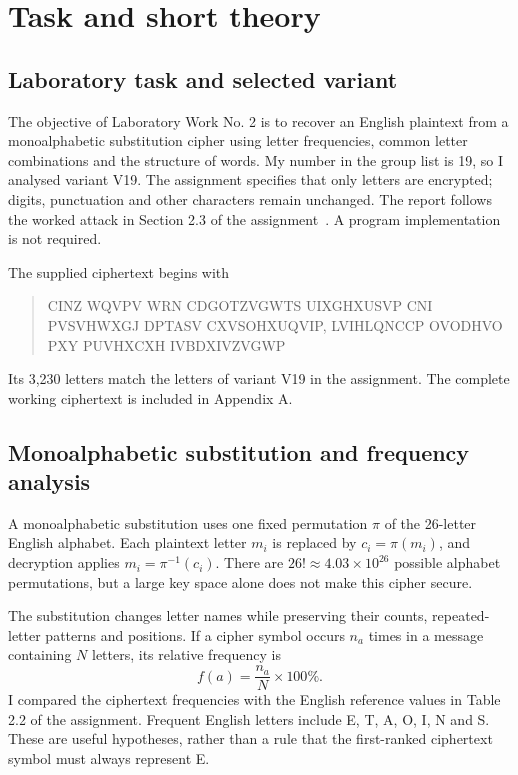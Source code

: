 \documentclass{tum_report}
\begin{document}

\clearpage
{}
\tableofcontents
\thispagestyle{empty}
\clearpage
\pagestyle{fancy}

\chapter{Task and short theory}
\section{Laboratory task and selected variant}
The objective of Laboratory Work No. 2 is to recover an English plaintext
from a monoalphabetic substitution cipher using letter frequencies, common
letter combinations and the structure of words. My number in the group
list is 19, so I analysed variant V19. The assignment specifies that only
letters are encrypted; digits, punctuation and other characters remain
unchanged. The report follows the worked attack in Section 2.3 of the
assignment~\cite{ref:assignment}. A program implementation is not required.

The supplied ciphertext begins with
\begin{quote}\small\ttfamily\raggedright
CINZ WQVPV WRN CDGOTZVGWTS UIXGHXUSVP CNI PVSVHWXGJ DPTASV
CXVSOHXUQVIP, LVIHLQNCCP OVODHVO PXY PUVHXCXH IVBDXIVZVGWP
\end{quote}
Its 3,230 letters match the letters of variant V19 in the assignment.
The complete working ciphertext is included in Appendix A.

\section{Monoalphabetic substitution and frequency analysis}
A monoalphabetic substitution uses one fixed permutation $\pi$ of the
26-letter English alphabet. Each plaintext letter $m_i$ is replaced by
$c_i=\pi(m_i)$, and decryption applies $m_i=\pi^{-1}(c_i)$. There are
$26!\approx4.03\times10^{26}$ possible alphabet permutations, but a large
key space alone does not make this cipher secure.

The substitution changes letter names while preserving their counts,
repeated-letter patterns and positions. If a cipher symbol occurs $n_a$
times in a message containing $N$ letters, its relative frequency is
\[
 f(a)=\frac{n_a}{N}\times100\%.
\]
I compared the ciphertext frequencies with the English reference values
in Table 2.2 of the assignment. Frequent English letters include E, T, A,
O, I, N and S. These are useful hypotheses, rather than a rule that the
first-ranked ciphertext symbol must always represent E.
\end{document}
